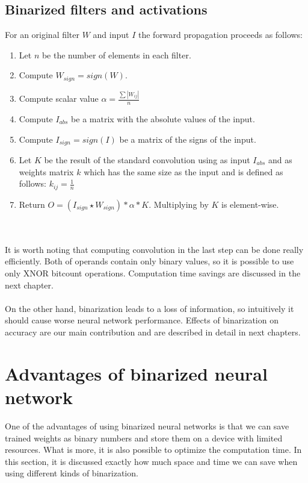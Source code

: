 \documentclass[licencjacka]{pracamgr}
\begin{document}
		\section{Binarized filters and activations}
		        For an original filter $W$ and input $I$ the forward propagation proceeds as follows:
		        \begin{enumerate}
		                \item Let $n$ be the number of elements in each filter.
		                \item Compute $W_{sign} = sign(W)$.
		                \item Compute scalar value $\alpha = \frac{\sum{|W_{ij}|}}{n}$
		                \item Compute $I_{abs}$ be a matrix with the absolute values of the input.
		                \item Compute $I_{sign} = sign(I)$ be a matrix of the signs of the input.
		                \item Let $K$ be the result of the standard convolution using as input $I_{abs}$ and as weights matrix $k$ which has the same size as the input and is defined as follows: $k_{ij} = \frac{1}{n}$
		                \item Return $O = (I_{sign} \star W_{sign}) * \alpha * K$. Multiplying by $K$ is element-wise.
		        \end{enumerate}
		        \\\\
		It is worth noting that computing convolution in the last step can be done really efficiently. Both of operands contain only binary values, so it is possible to use only XNOR bitcount operations. Computation time savings are discussed in the next chapter.
		\\\\
		On the other hand, binarization leads to a loss of information, so intuitively it should cause worse neural network performance. Effects of binarization on accuracy are our main contribution and are described in detail in next chapters.
		
	\chapter{Advantages of binarized neural network}
    One of the advantages of using binarized neural networks is that we can save trained weights as binary numbers and store them on a device with limited resources. What is more, it is also possible to optimize the computation time. In this section, it is discussed exactly how much space and time we can save when using different kinds of binarization.
    
\end{document}
